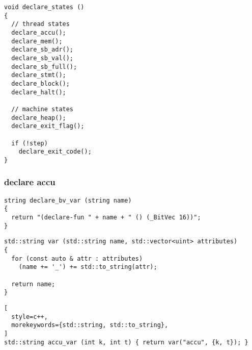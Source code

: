 \begin{lstlisting}[style=c++]
void declare_states ()
{
  // thread states
  declare_accu();
  declare_mem();
  declare_sb_adr();
  declare_sb_val();
  declare_sb_full();
  declare_stmt();
  declare_block();
  declare_halt();

  // machine states
  declare_heap();
  declare_exit_flag();

  if (!step)
    declare_exit_code();
}
\end{lstlisting}

\subsubsection{declare accu}

\begin{algorithm}[H]
\end{algorithm}

\begin{algorithm}[H]
\end{algorithm}

\begin{algorithm}[H]
\end{algorithm}

\begin{lstlisting}[style=c++]
string declare_bv_var (string name)
{
  return "(declare-fun " + name + " () (_BitVec 16))";
}
\end{lstlisting}

\begin{lstlisting}[style=c++]
std::string var (std::string name, std::vector<uint> attributes)
{
  for (const auto & attr : attributes)
    (name += '_') += std::to_string(attr);

  return name;
}
\end{lstlisting}

\begin{lstlisting}[
  style=c++,
  morekeywords={std::string, std::to_string},
]
std::string accu_var (int k, int t) { return var("accu", {k, t}); }
\end{lstlisting}


